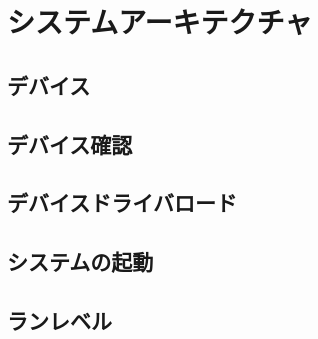 \section{システムアーキテクチャ}
\subsection{デバイス}
\subsection{デバイス確認}
\subsection{デバイスドライバロード}
\subsection{システムの起動}
\subsection{ランレベル}